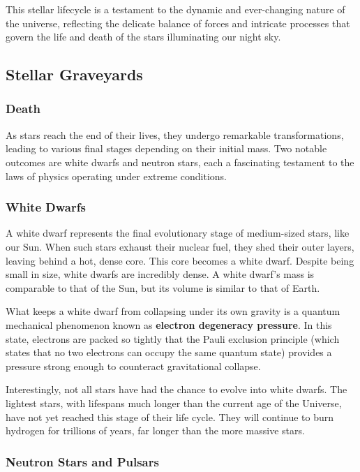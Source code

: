 This stellar lifecycle is a testament to the dynamic and ever-changing nature of the universe, reflecting the delicate balance of forces and intricate processes that govern the life and death of the stars illuminating our night sky.


\subsection{Stellar Graveyards}
\subsubsection{Death}

As stars reach the end of their lives, they undergo remarkable transformations, leading to various final stages depending on their initial mass. Two notable outcomes are white dwarfs and neutron stars, each a fascinating testament to the laws of physics operating under extreme conditions.

\subsubsection{White Dwarfs}

A white dwarf represents the final evolutionary stage of medium-sized stars, like our Sun. When such stars exhaust their nuclear fuel, they shed their outer layers, leaving behind a hot, dense core. This core becomes a white dwarf. Despite being small in size, white dwarfs are incredibly dense. A white dwarf's mass is comparable to that of the Sun, but its volume is similar to that of Earth.

What keeps a white dwarf from collapsing under its own gravity is a quantum mechanical phenomenon known as \textbf{electron degeneracy pressure}. In this state, electrons are packed so tightly that the Pauli exclusion principle (which states that no two electrons can occupy the same quantum state) provides a pressure strong enough to counteract gravitational collapse.

Interestingly, not all stars have had the chance to evolve into white dwarfs. The lightest stars, with lifespans much longer than the current age of the Universe, have not yet reached this stage of their life cycle. They will continue to burn hydrogen for trillions of years, far longer than the more massive stars.

\subsubsection{Neutron Stars and Pulsars}

